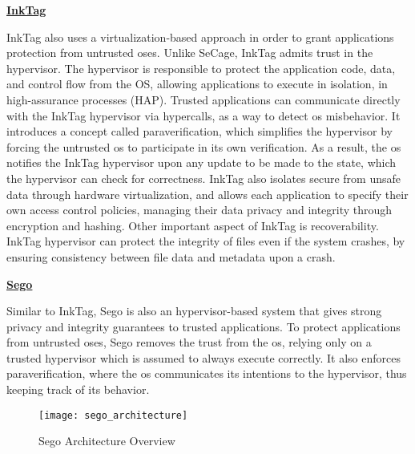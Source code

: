 
\underline{\textbf{InkTag}}

InkTag \cite{inkTagPaper} also uses a virtualization-based approach in order to grant applications protection from untrusted \gls{os}es.
Unlike SeCage, InkTag admits trust in the hypervisor. The hypervisor is responsible to protect the application
code, data, and control flow from the OS, allowing applications to execute in isolation, in high-assurance processes (HAP). Trusted applications can communicate directly with the InkTag hypervisor via hypercalls, as a way to detect \gls{os} misbehavior.
It introduces a concept called paraverification, which simplifies the hypervisor by forcing the untrusted \gls{os} to participate in its own verification. As a result, the \gls{os} notifies the InkTag hypervisor upon any update to be made to the state, which the hypervisor can check for correctness. 
InkTag also isolates secure from unsafe data through hardware virtualization, and allows each application to specify their own access control policies, managing their data privacy and integrity through encryption and hashing.
Other important aspect of InkTag is recoverability. InkTag hypervisor can protect the integrity of files even if the system crashes, by ensuring consistency between file data and metadata upon a crash.\newline

\pagebreak
\underline{\textbf{Sego}}

Similar to InkTag, Sego \cite{segoPaper} is also an hypervisor-based system that gives strong privacy and integrity guarantees to trusted applications. To protect applications from untrusted \gls{os}es, Sego removes the trust from the \gls{os}, relying only on a trusted hypervisor which is assumed to always execute correctly. It also enforces paraverification, where the \gls{os} communicates its intentions to the hypervisor, thus keeping track of its behavior.

\begin{figure}[htbp]
	\centering
	{\texttt{[image: sego\_architecture]}}
	\caption{Sego Architecture Overview}
	\label{fig:segoArchitecture}
\end{figure}

